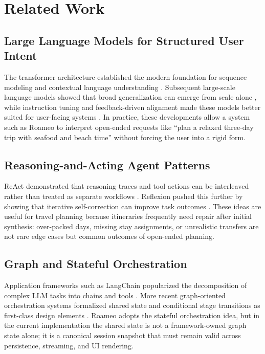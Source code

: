 \documentclass[conference]{IEEEtran}
\begin{document}
\section{Related Work}

\subsection{Large Language Models for Structured User Intent}

The transformer architecture established the modern foundation for sequence modeling and contextual language understanding \cite{vaswani2017attention}. Subsequent large-scale language models showed that broad generalization can emerge from scale alone \cite{brown2020language}, while instruction tuning and feedback-driven alignment made these models better suited for user-facing systems \cite{ouyang2022training}. In practice, these developments allow a system such as Roameo to interpret open-ended requests like ``plan a relaxed three-day trip with seafood and beach time'' without forcing the user into a rigid form.

\subsection{Reasoning-and-Acting Agent Patterns}

ReAct demonstrated that reasoning traces and tool actions can be interleaved rather than treated as separate workflows \cite{yao2023react}. Reflexion pushed this further by showing that iterative self-correction can improve task outcomes \cite{shinn2023reflexion}. These ideas are useful for travel planning because itineraries frequently need repair after initial synthesis: over-packed days, missing stay assignments, or unrealistic transfers are not rare edge cases but common outcomes of open-ended planning.

\subsection{Graph and Stateful Orchestration}

Application frameworks such as LangChain popularized the decomposition of complex LLM tasks into chains and tools \cite{langchain2022}. More recent graph-oriented orchestration systems formalized shared state and conditional stage transitions as first-class design elements \cite{langgraph2024}. Roameo adopts the stateful orchestration idea, but in the current implementation the shared state is not a framework-owned graph state alone; it is a canonical session snapshot that must remain valid across persistence, streaming, and UI rendering.
\end{document}
